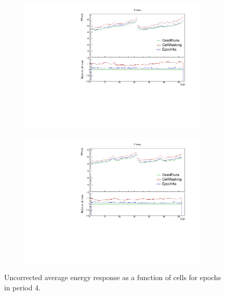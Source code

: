 \documentclass[12pt,a4paper]{article}
\begin{document}
\begin{figure}[!hbtp]
\centering
\begin{subfigure}[b]{0.495\textwidth}
\centering
\includegraphics[width=\textwidth]{Plots/Attenprofs_P4Data_CellPE_X_Combined.pdf}
\end{subfigure}
\begin{subfigure}[b]{0.495\textwidth}
\centering
\includegraphics[width=\textwidth]{Plots/Attenprofs_P4Data_CellPE_Y_Combined.pdf}
\end{subfigure}
\caption{Uncorrected average energy response as a function of cells for epochs in period 4.}
\label{figCalibhistCellPE_period4}
\end{figure}
\end{document}
